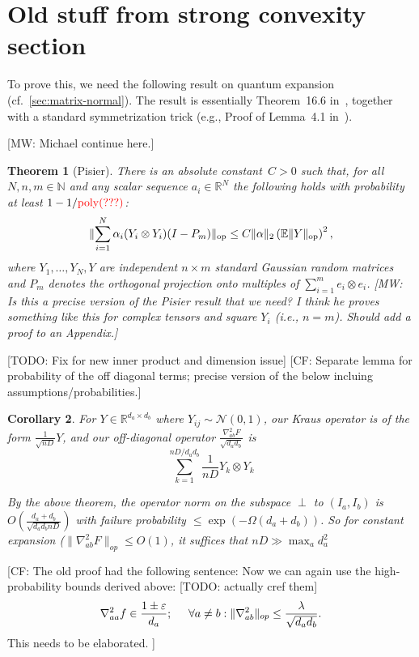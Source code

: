 \documentclass{article}
\newtheorem{theorem}{Theorem}
\newtheorem{corollary}[theorem]{Corollary}
\DeclareMathOperator{\poly}{poly}
\DeclarePairedDelimiter{\norm}{\lVert}{\rVert}
\newcommand{\R}{{\mathbb{R}}}
\newcommand{\ot}{\otimes}
\newcommand{\op}{\operatorname{op}}
\newcommand{\N}{{\mathbb{N}}}
\newcommand{\E}{\mathbb{E}}
\newcommand\eps{\varepsilon}
\newcommand{\CF}[1]{{\color{purple}[CF: #1]}}
\newcommand{\MW}[1]{{\color{red}[MW: #1]}}
\newcommand{\TODO}[1]{{\color{blue}[TODO: #1]}}
\begin{document}
\section{Old stuff from strong convexity section}


To prove this, we need the following result on quantum expansion (cf.\ \cref{sec:matrix-normal}).
The result is essentially Theorem~16.6 in~\cite{pisier2012grothendieck}, together with a standard symmetrization trick (e.g., Proof of Lemma~4.1 in~\cite{P14}).

\MW{Michael continue here.} 

\begin{theorem}[Pisier]
There is an absolute constant~$C>0$ such that, for all $N,n,m\in\N$ and any scalar sequence $a_i \in \R^N$ the following holds with probability at least $1-1/{\color{red}\poly(???)}$:
\begin{align*}
  \norm{ \sum_{i=1}^N \alpha_i (Y_i \ot Y_i) (I - P_m) }_{\op}
\leq C \norm{\alpha}_2 \left( \E \norm{Y}_{\op} \right)^2,
\end{align*}
where $Y_1,\dots,Y_N,Y$ are independent $n\times m$ standard Gaussian random matrices and $P_m$ denotes the orthogonal projection onto multiples of $\sum_{i=1}^m e_i \ot e_i$.
\MW{Is this a precise version of the Pisier result that we need? I think he proves something like this for complex tensors and square $Y_i$ (i.e., $n=m$). Should add a proof to an Appendix.}
\end{theorem}

\TODO{Fix for new inner product and dimension issue}
\CF{Separate lemma for probability of the off diagonal terms; precise version of the below incluing assumptions/probabilities.}
\begin{corollary} \label{offdiagPisier}
For $Y \in \R^{d_{a} \times d_{b}}$ where $Y_{ij} \sim \mathcal{N}(0,1)$, our Kraus operator is of the form $\frac{1}{\sqrt{nD}} Y$, and our off-diagonal operator $\frac{\nabla^{2}_{ab} F}{\sqrt{d_{a} d_{b}}}$ is
\[ \sum_{k=1}^{nD/d_{a}d_{b}} \frac{1}{nD} Y_{k} \otimes Y_{k}   \]

By the above theorem, the operator norm on the subspace $\perp$ to $(I_{a},I_{b})$ is $O \left( \frac{d_{a}+d_{b}}{\sqrt{d_{a} d_{b} nD}} \right)$ with failure probability $\leq \exp(-\Omega(d_{a} + d_{b}))$. So for constant expansion ($\|\nabla^{2}_{ab} F\|_{op} \leq O(1)$, it suffices that $nD \gg \max_{a} d_{a}^{2}$
\end{corollary}

\CF{The old proof had the following sentence: 
Now we can again use the high-probability bounds derived above: \TODO{actually cref them}
\begin{align}\nabla^{2}_{aa} f \in \frac{1 \pm \eps}{d_{a}}; \hspace{5mm} \forall a \neq b: \|\nabla^{2}_{ab}\|_{op} \leq \frac{\lambda}{\sqrt{d_{a} d_{b}}}. \label{eq:expansion-thing}  \end{align}
This needs to be elaborated.
}
\end{document}
